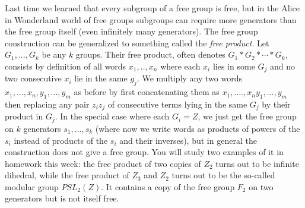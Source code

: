 Last time we learned that every subgroup of a free group is free, but in the Alice in Wonderland world of free groups subgroups can require more generators than the free group itself (even infinitely many generators).  The free group construction can be generalized to something called the {\sl free product}.  Let $G_1,...,G_k$ be any $k$ groups.  Their free product, often denotes
$G_1\ast G_2\ast\cdots\ast G_k$, consists by definition of all words $x_1,..,x_n$ where each $x_i$ lies in some $G_j$ and no two consecutive $x_i$ lie in the same $g_j$.  We multiply any two words $x_1,...,x_n,y_1,...,y_m$ as before by first concatenating them as $x_1,....,x_n y_1,...,y_m$ then replacing any pair $z_i z_j$ of consecutive terms lying in the same $G_j$ by their product in $G_j$.  In the special case where each $G_i= Z$, we just get the free group on $k$ generators $s_1,...,s_k$ (where now we write words as products of powers of the $s_i$ instead of products of the $s_i$ and their inverses), but in general the construction does not give a free group.  You will study two examples of it in homework this week:  the free product of two copies of $Z_2$ turns out to be infinite dihedral, while the free product of $Z_3$ and $Z_2$ turns out to be the so-called modular group
$PSL_2(Z)$.  It contains a copy of the free group $F_2$ on two generators but is not itself free.  

